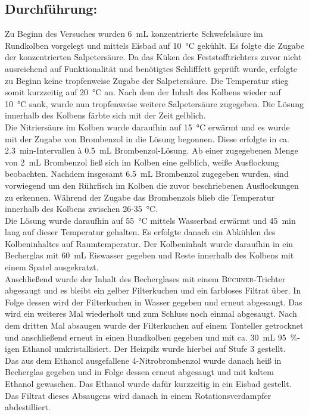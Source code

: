 \subsection*{Durchführung:}
Zu Beginn des Versuches wurden \SI{6}{\milli \liter} konzentrierte Schwefelsäure im Rundkolben vorgelegt und mittels Eisbad auf \SI{10}{\celsius} gekühlt. Es folgte die Zugabe der konzentrierten Salpetersäure. Da das Küken des Feststofftrichters zuvor nicht ausreichend auf Funktionalität und benötigtes Schlifffett geprüft wurde, erfolgte zu Beginn keine tropfenweise Zugabe der Salpetersäure. Die Temperatur stieg somit kurzzeitig auf \SI{20}{\celsius} an. Nach dem der Inhalt des Kolbens wieder auf \SI{10}{\celsius} sank, wurde nun tropfenweise weitere Salpetersäure zugegeben. Die Lösung innerhalb des Kolbens färbte sich mit der Zeit gelblich. \\
Die Nitriersäure im Kolben wurde daraufhin auf \SI{15}{\celsius} erwärmt und es wurde mit der Zugabe von Brombenzol in die Lösung begonnen. Diese erfolgte in ca. \SI{2,3}{\minute}-Intervallen à \SI{0,5}{\milli \liter} Brombenzol-Lösung. Ab einer zugegebenen Menge von \SI{2}{\milli \liter} Brombenzol ließ sich im Kolben eine gelblich, weiße Ausflockung beobachten. Nachdem insgesamt \SI{6,5}{\milli \liter} Brombenzol zugegeben wurden, sind vorwiegend um den Rührfisch im Kolben die zuvor beschriebenen Ausflockungen zu erkennen. Während der Zugabe das Brombenzols blieb die Temperatur innerhalb des Kolbens zwischen 26-\SI{35}{\celsius}.\\
Die Lösung wurde daraufhin auf \SI{55}{\celsius}  mittels Wasserbad erwärmt und \SI{45}{\minute} lang auf dieser Temperatur gehalten. Es erfolgte danach ein Abkühlen des Kolbeninhaltes auf Raumtemperatur. Der Kolbeninhalt wurde daraufhin in ein Becherglas mit \SI{60}{\milli \liter} Eiswasser gegeben und Reste innerhalb des Kolbens mit einem Spatel ausgekratzt.\\
\newpage
Anschließend wurde der Inhalt des Becherglases mit einem \textsc{Büchner}-Trichter abgesaugt und es bleibt ein gelber Filterkuchen und ein farbloses Filtrat über. In Folge dessen wird der Filterkuchen in Wasser gegeben und erneut abgesaugt. Das wird ein weiteres Mal wiederholt und zum Schluss noch einmal abgesaugt. Nach dem dritten Mal absaugen wurde der Filterkuchen auf einem Tonteller getrocknet und anschließend erneut in einen Rundkolben gegeben und mit ca. \SI{30}{\milli \liter}  \SI{95}{\percent}-igen Ethanol umkristallisiert. Der Heizpilz wurde hierbei auf Stufe 3 gestellt.\\
Das aus dem Ethanol ausgefallene 4-Nitrobrombenzol wurde danach heiß in Becherglas gegeben und in Folge dessen erneut abgesaugt und mit kaltem Ethanol gewaschen. Das Ethanol wurde dafür kurzzeitig in ein Eisbad gestellt. Das Filtrat dieses Absaugens wird danach in einem Rotationsverdampfer abdestilliert.

